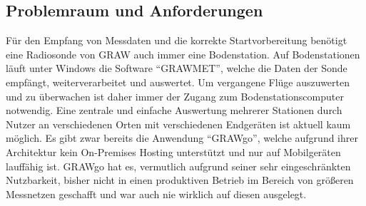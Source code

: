 \subsection{Problemraum und Anforderungen}
Für den Empfang von Messdaten und die korrekte Startvorbereitung benötigt eine Radiosonde von GRAW auch immer eine Bodenstation.
Auf Bodenstationen läuft unter Windows die Software \enquote{GRAWMET}\cite{grawmet}, welche die Daten der Sonde empfängt, weiterverarbeitet und auswertet.
Um vergangene Flüge auszuwerten und zu überwachen ist daher immer der Zugang zum Bodenstationscomputer notwendig.
Eine zentrale und einfache Auswertung mehrerer Stationen durch Nutzer an verschiedenen Orten mit verschiedenen Endgeräten ist aktuell kaum möglich.
Es gibt zwar bereits die Anwendung \enquote{GRAWgo}\cite{grawgo}, welche aufgrund ihrer Architektur kein On-Premises Hosting unterstützt und nur auf Mobilgeräten lauffähig ist.
GRAWgo hat es, vermutlich aufgrund seiner sehr eingeschränkten Nutzbarkeit, bisher nicht in einen produktiven Betrieb im Bereich von größeren Messnetzen geschafft und war auch nie wirklich auf diesen ausgelegt.

